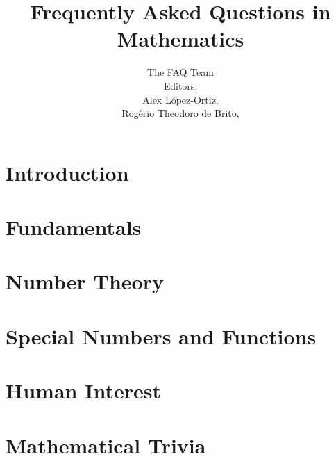 \documentclass[a4paper]{report}
\title{Frequently Asked Questions in Mathematics}
\author{The \scimath FAQ Team\\
  \bigskip
  {\small Editors:}\\
  \bigskip
  {\small Alex L\'{o}pez-Ortiz, \emailalopez}\\
  {\small Rog\'{e}rio Theodoro de Brito, \emailrbrito}
}
\begin{document}
\maketitle
\tableofcontents


\chapter{Introduction}
  
\chapter{Fundamentals}
  
  
  
  
\chapter{Number Theory}
  
  
\chapter{Special Numbers and Functions}
  
  
  
  
  
  
\chapter{Human Interest}
  
  
  
  
  
  
\chapter{Mathematical Trivia}
  
\end{document}
